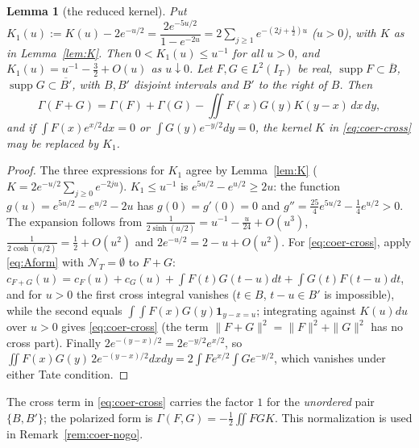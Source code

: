 \documentclass[11pt]{amsart}
\newtheorem{lemma}[theorem]{Lemma}
\theoremstyle{definition}
\theoremstyle{remark}
\newcommand{\supp}{\operatorname{supp}}
\newcommand{\IT}{I_T}
\newcommand{\cF}{c_F}
\newcommand{\NT}{\mathcal N_T}
\begin{document}
\begin{lemma}[the reduced kernel]\label{lem:coer-K1}
Put $K_1(u):=K(u)-2e^{-u/2}=\dfrac{2e^{-5u/2}}{1-e^{-2u}}=2\sum_{j\ge1}e^{-(2j+\frac12)u}$ ($u>0$), with
$K$ as in Lemma~\ref{lem:K}. Then $0<K_1(u)\le u^{-1}$ for all $u>0$, and $K_1(u)=u^{-1}-\frac32+O(u)$ as
$u\downarrow0$. Let $F,G\in L^2(\IT)$ be real, $\supp F\subset\overline B$, $\supp G\subset\overline{B'}$,
with $B,B'$ disjoint intervals and $B'$ to the right of $B$. Then
\begin{equation}\label{eq:coer-cross}
\Gamma(F+G)=\Gamma(F)+\Gamma(G)-\iint F(x)G(y)K(y-x)\,dx\,dy ,
\end{equation}
and if $\int F(x)e^{x/2}dx=0$ or $\int G(y)e^{-y/2}dy=0$, the kernel $K$ in \eqref{eq:coer-cross} may be
replaced by $K_1$.
\end{lemma}
\begin{proof}
The three expressions for $K_1$ agree by Lemma~\ref{lem:K} ($K=2e^{-u/2}\sum_{j\ge0}e^{-2ju}$).
$K_1\le u^{-1}$ is $e^{5u/2}-e^{u/2}\ge2u$: the function $g(u)=e^{5u/2}-e^{u/2}-2u$ has $g(0)=g'(0)=0$ and
$g''=\frac{25}4e^{5u/2}-\frac14e^{u/2}>0$. The expansion follows from
$\frac1{2\sinh(u/2)}=u^{-1}-\frac u{24}+O(u^3)$, $\frac1{2\cosh(u/2)}=\frac12+O(u^2)$ and
$2e^{-u/2}=2-u+O(u^2)$. For \eqref{eq:coer-cross}, apply \eqref{eq:Aform} with $\NT=\emptyset$ to
$F+G$: $c_{F+G}(u)=\cF(u)+c_G(u)+\int F(t)G(t-u)dt+\int G(t)F(t-u)dt$, and for $u>0$ the first cross
integral vanishes ($t\in B$, $t-u\in B'$ is impossible), while the second equals
$\int\!\!\int F(x)G(y)\mathbf 1_{y-x=u}$; integrating against $K(u)du$ over $u>0$ gives
\eqref{eq:coer-cross} (the term $\|F+G\|^2=\|F\|^2+\|G\|^2$ has no cross part). Finally
$2e^{-(y-x)/2}=2e^{-y/2}e^{x/2}$, so $\iint F(x)G(y)\,2e^{-(y-x)/2}dxdy=2\int Fe^{x/2}\int Ge^{-y/2}$,
which vanishes under either Tate condition.
\end{proof}
The cross term in \eqref{eq:coer-cross} carries the factor $1$ for the \emph{unordered} pair $\{B,B'\}$; the
polarized form is $\Gamma(F,G)=-\frac12\iint FGK$. This normalization is used in Remark~\ref{rem:coer-nogo}.
\end{document}

